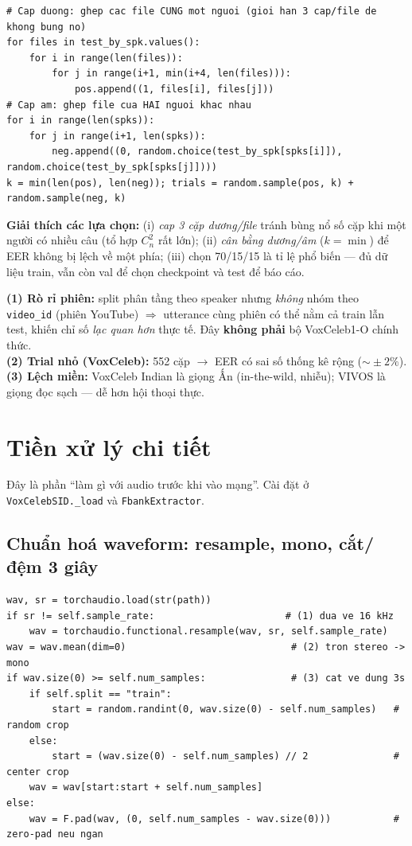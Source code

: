 \documentclass[12pt,a4paper]{article}
\begin{document}
\begin{lstlisting}
# Cap duong: ghep cac file CUNG mot nguoi (gioi han 3 cap/file de khong bung no)
for files in test_by_spk.values():
    for i in range(len(files)):
        for j in range(i+1, min(i+4, len(files))):
            pos.append((1, files[i], files[j]))
# Cap am: ghep file cua HAI nguoi khac nhau
for i in range(len(spks)):
    for j in range(i+1, len(spks)):
        neg.append((0, random.choice(test_by_spk[spks[i]]), random.choice(test_by_spk[spks[j]])))
k = min(len(pos), len(neg)); trials = random.sample(pos, k) + random.sample(neg, k)
\end{lstlisting}

\textbf{Giải thích các lựa chọn:} (i) \emph{cap 3 cặp dương/file} tránh bùng nổ số
cặp khi một người có nhiều câu (tổ hợp $C^2_n$ rất lớn); (ii) \emph{cân bằng
dương/âm} ($k=\min$) để EER không bị lệch về một phía; (iii) chọn 70/15/15 là tỉ
lệ phổ biến --- đủ dữ liệu train, vẫn còn val để chọn checkpoint và test để báo cáo.

\begin{luuybox}
\textbf{(1) Rò rỉ phiên:} split phân tầng theo speaker nhưng \emph{không} nhóm theo
\texttt{video\_id} (phiên YouTube) $\Rightarrow$ utterance cùng phiên có thể nằm cả
train lẫn test, khiến chỉ số \emph{lạc quan hơn} thực tế. Đây \textbf{không phải}
bộ VoxCeleb1-O chính thức.\\
\textbf{(2) Trial nhỏ (VoxCeleb):} 552 cặp $\to$ EER có sai số thống kê rộng
($\sim\!\pm2\%$).\\
\textbf{(3) Lệch miền:} VoxCeleb Indian là giọng Ấn (in-the-wild, nhiễu); VIVOS là
giọng đọc sạch --- dễ hơn hội thoại thực.
\end{luuybox}

\section{Tiền xử lý chi tiết}
Đây là phần ``làm gì với audio trước khi vào mạng''. Cài đặt ở
\texttt{VoxCelebSID.\_load} và \texttt{FbankExtractor}.

\subsection{Chuẩn hoá waveform: resample, mono, cắt/đệm 3 giây}
\begin{lstlisting}
wav, sr = torchaudio.load(str(path))
if sr != self.sample_rate:                       # (1) dua ve 16 kHz
    wav = torchaudio.functional.resample(wav, sr, self.sample_rate)
wav = wav.mean(dim=0)                             # (2) tron stereo -> mono
if wav.size(0) >= self.num_samples:               # (3) cat ve dung 3s
    if self.split == "train":
        start = random.randint(0, wav.size(0) - self.num_samples)   # random crop
    else:
        start = (wav.size(0) - self.num_samples) // 2               # center crop
    wav = wav[start:start + self.num_samples]
else:
    wav = F.pad(wav, (0, self.num_samples - wav.size(0)))           # zero-pad neu ngan
\end{lstlisting}
\end{document}
